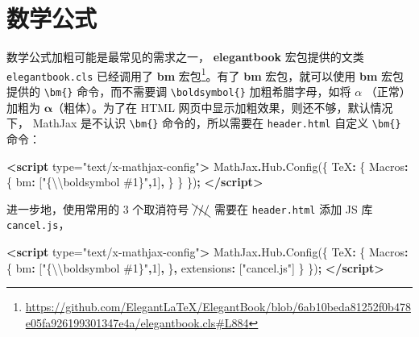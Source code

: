 \documentclass[
  lang=cn,
  11pt,
  scheme=chinese,
  chinesefont=nofont,
  bibstyle=apalike]{elegantbook}
\newenvironment{Shaded}{\begin{snugshade}}{\end{snugshade}}
\newcommand{\AttributeTok}[1]{\textcolor[rgb]{0.77,0.63,0.00}{#1}}
\newcommand{\DataTypeTok}[1]{\textcolor[rgb]{0.13,0.29,0.53}{#1}}
\newcommand{\DecValTok}[1]{\textcolor[rgb]{0.00,0.00,0.81}{#1}}
\newcommand{\FunctionTok}[1]{\textcolor[rgb]{0.00,0.00,0.00}{#1}}
\newcommand{\KeywordTok}[1]{\textcolor[rgb]{0.13,0.29,0.53}{\textbf{#1}}}
\newcommand{\NormalTok}[1]{#1}
\newcommand{\OperatorTok}[1]{\textcolor[rgb]{0.81,0.36,0.00}{\textbf{#1}}}
\newcommand{\OtherTok}[1]{\textcolor[rgb]{0.56,0.35,0.01}{#1}}
\newcommand{\SpecialCharTok}[1]{\textcolor[rgb]{0.00,0.00,0.00}{#1}}
\newcommand{\StringTok}[1]{\textcolor[rgb]{0.31,0.60,0.02}{#1}}
\begin{document}
\hypertarget{math-formular}{%
\section{数学公式}\label{math-formular}}

数学公式加粗可能是最常见的需求之一， \textbf{elegantbook} 宏包提供的文类 \texttt{elegantbook.cls} 已经调用了 \textbf{bm} 宏包\footnote{\url{https://github.com/ElegantLaTeX/ElegantBook/blob/6ab10beda81252f0b478e05fa926199301347e4a/elegantbook.cls\#L884}}。有了 \textbf{bm} 宏包，就可以使用 \textbf{bm} 宏包提供的 \texttt{\textbackslash{}bm\{\}} 命令，而不需要调 \texttt{\textbackslash{}boldsymbol\{\}} 加粗希腊字母，如将 \(\alpha\) （正常）加粗为 \(\bm{\alpha}\)（粗体）。为了在 HTML 网页中显示加粗效果，则还不够，默认情况下， MathJax 是不认识 \texttt{\textbackslash{}bm\{\}} 命令的，所以需要在 \texttt{header.html} 自定义 \texttt{\textbackslash{}bm\{\}} 命令：

\begin{Shaded}
\begin{Highlighting}[]
\KeywordTok{\textless{}script}\OtherTok{ type=}\StringTok{"text/x{-}mathjax{-}config"}\KeywordTok{\textgreater{}}
\NormalTok{    MathJax}\OperatorTok{.}\AttributeTok{Hub}\OperatorTok{.}\FunctionTok{Config}\NormalTok{(\{}
      \DataTypeTok{TeX}\OperatorTok{:}\NormalTok{ \{}
        \DataTypeTok{Macros}\OperatorTok{:}\NormalTok{ \{}
          \DataTypeTok{bm}\OperatorTok{:}\NormalTok{ [}\StringTok{"\{}\SpecialCharTok{\textbackslash{}\textbackslash{}}\StringTok{boldsymbol \#1\}"}\OperatorTok{,}\DecValTok{1}\NormalTok{]}\OperatorTok{,}
\NormalTok{        \}}
\NormalTok{      \}}
\NormalTok{    \})}\OperatorTok{;}
\KeywordTok{\textless{}/script\textgreater{}}
\end{Highlighting}
\end{Shaded}

进一步地，使用常用的 3 个取消符号 \(\bcancel{///}\) 需要在 \texttt{header.html} 添加 JS 库 \texttt{cancel.js}，

\begin{Shaded}
\begin{Highlighting}[]
\KeywordTok{\textless{}script}\OtherTok{ type=}\StringTok{"text/x{-}mathjax{-}config"}\KeywordTok{\textgreater{}}
\NormalTok{    MathJax}\OperatorTok{.}\AttributeTok{Hub}\OperatorTok{.}\FunctionTok{Config}\NormalTok{(\{}
      \DataTypeTok{TeX}\OperatorTok{:}\NormalTok{ \{}
        \DataTypeTok{Macros}\OperatorTok{:}\NormalTok{ \{}
          \DataTypeTok{bm}\OperatorTok{:}\NormalTok{ [}\StringTok{"\{}\SpecialCharTok{\textbackslash{}\textbackslash{}}\StringTok{boldsymbol \#1\}"}\OperatorTok{,}\DecValTok{1}\NormalTok{]}\OperatorTok{,}
\NormalTok{        \}}\OperatorTok{,}
        \DataTypeTok{extensions}\OperatorTok{:}\NormalTok{ [}\StringTok{"cancel.js"}\NormalTok{]}
\NormalTok{      \}}
\NormalTok{    \})}\OperatorTok{;}
\KeywordTok{\textless{}/script\textgreater{}}
\end{Highlighting}
\end{Shaded}
\end{document}

